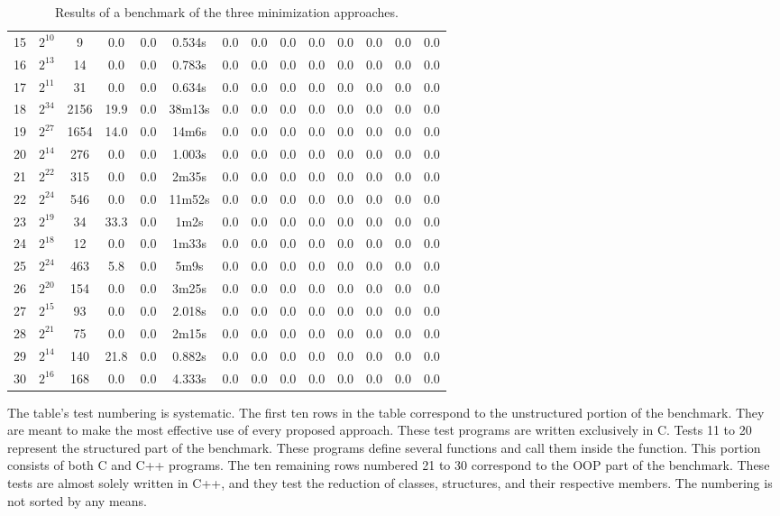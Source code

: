 \begin{table}[b!]
\begin{tabular}{SSSSSSSSSSSSSS}
    15 & {$2^{10}$} & 9 & 0.0 & 0.0 & 0.534s & 0.0 & 0.0 & 0.0 & 0.0 & 0.0 & 0.0 & 0.0 & 0.0  \\
    16 & {$2^{13}$} & 14 & 0.0 & 0.0 & 0.783s & 0.0 & 0.0 & 0.0 & 0.0 & 0.0 & 0.0 & 0.0 & 0.0  \\
    17 & {$2^{11}$} & 31 & 0.0 & 0.0 & 0.634s & 0.0 & 0.0 & 0.0 & 0.0 & 0.0 & 0.0 & 0.0 & 0.0  \\
    18 & {$2^{34}$} & 2156 & 19.9 & 0.0 & 38m13s & 0.0 & 0.0 & 0.0 & 0.0 & 0.0 & 0.0 & 0.0 & 0.0  \\
    19 & {$2^{27}$} & 1654 & 14.0 & 0.0 & 14m6s & 0.0 & 0.0 & 0.0 & 0.0 & 0.0 & 0.0 & 0.0 & 0.0  \\
    20 & {$2^{14}$} & 276 & 0.0 & 0.0 & 1.003s & 0.0 & 0.0 & 0.0 & 0.0 & 0.0 & 0.0 & 0.0 & 0.0  \\  & {$2^{22}$} & 315 & 0.0 & 0.0 & 2m35s & 0.0 & 0.0 & 0.0 & 0.0 & 0.0 & 0.0 & 0.0 & 0.0  \\
    22 & {$2^{24}$} & 546 & 0.0 & 0.0 & 11m52s & 0.0 & 0.0 & 0.0 & 0.0 & 0.0 & 0.0 & 0.0 & 0.0  \\
    23 & {$2^{19}$} & 34 & 33.3 & 0.0 & 1m2s & 0.0 & 0.0 & 0.0 & 0.0 & 0.0 & 0.0 & 0.0 & 0.0  \\
    24 & {$2^{18}$} & 12 & 0.0 & 0.0 & 1m33s & 0.0 & 0.0 & 0.0 & 0.0 & 0.0 & 0.0 & 0.0 & 0.0  \\
    25 & {$2^{24}$} & 463 & 5.8 & 0.0 & 5m9s & 0.0 & 0.0 & 0.0 & 0.0 & 0.0 & 0.0 & 0.0 & 0.0  \\
    26 & {$2^{20}$} & 154 & 0.0 & 0.0 & 3m25s & 0.0 & 0.0 & 0.0 & 0.0 & 0.0 & 0.0 & 0.0 & 0.0  \\
    27 & {$2^{15}$} & 93 & 0.0 & 0.0 & 2.018s & 0.0 & 0.0 & 0.0 & 0.0 & 0.0 & 0.0 & 0.0 & 0.0  \\
    28 & {$2^{21}$} & 75 & 0.0 & 0.0 & 2m15s & 0.0 & 0.0 & 0.0 & 0.0 & 0.0 & 0.0 & 0.0 & 0.0  \\
    29 & {$2^{14}$} & 140 & 21.8 & 0.0 & 0.882s & 0.0 & 0.0 & 0.0 & 0.0 & 0.0 & 0.0 & 0.0 & 0.0  \\
    30 & {$2^{16}$} & 168 & 0.0 & 0.0 & 4.333s & 0.0 & 0.0 & 0.0 & 0.0 & 0.0 & 0.0 & 0.0 & 0.0  \\ \bottomrule
\end{tabular}
\caption{Results of a benchmark of the three minimization approaches.}
\label{tab:results}
\end{table}

The table's test numbering is systematic. 
The first ten rows in the table correspond to the unstructured portion of 
the benchmark. 
They are meant to make the most effective use of every proposed approach. 
These test programs are written exclusively in C. 
Tests 11 to 20 represent the structured part of the benchmark. 
These programs define several functions and call them inside 
the  function. 
This portion consists of both C and C++ programs.
The ten remaining rows numbered 21 to 30 correspond to the OOP part of 
the benchmark. 
These tests are almost solely written in C++, and they test the reduction 
of classes, structures, and their respective members.
The numbering is not sorted by any means.

